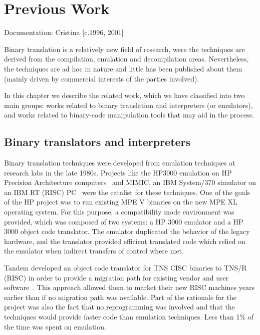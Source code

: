 
\chapter{Previous Work}
\label{ch-prevwork}

{\small
\begin{flushright}
Documentation: Cristina [c.1996, 2001]
\end{flushright} 
}

Binary translation is a relatively new field of research, were the
techniques are derived from the compilation, emulation and decompilation areas. 
Nevertheless, the techniques are ad hoc in nature and little has been 
published about them (mainly driven by commercial interests of the parties
involved).  

In this chapter we describe the related work, which we have classified
into two main groups: works related to binary translation and interpreters 
(or emulators), and works related to binary-code manipulation tools that 
may aid in the process.


\section{Binary translators and interpreters} 
Binary translation techniques were developed from emulation
techniques at research labs in the late 1980s.  Projects
like the HP3000 emulation on HP Precision Architecture
computers~\cite{Berg87} and MIMIC, an IBM System/370 simulator on an
IBM RT (RISC) PC~\cite{May87} were the catalist for these techniques.
One of the goals of the HP project was to run existing MPE V binaries
on the new MPE XL operating system.  For this purpose, a compatibility
mode environment was provided, which was composed of two systems:
a HP 3000 emulator and a HP 3000 object code translator.  The emulator
duplicated the behavior of the legacy hardware, and the translator
provided efficient translated code which relied on the emulator
when indirect transfers of control where met.

Tandem developed an object code translator for TNS CISC binaries
to TNS/R (RISC) in order to provide a migration path for existing
vendor and user software~\cite{Andr92}.  This approach allowed
them to market their new RISC machines years earlier than if no
migration path was available.  Part of the rationale for the
project was also the fact that no reprogramming was involved and
that the techniques would provide faster code than emulation
techniques.  Less than 1\% of the time was spent on emulation.

